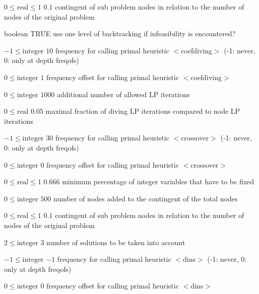 %
{$0\leq\textrm{real}\leq1$}%
{$0.1$}%
{contingent of sub problem nodes in relation to the number of nodes of the original problem}%
{}

%
{boolean}%
{TRUE}%
{use one level of backtracking if infeasibility is encountered?}%
{}

%
{$-1\leq\textrm{integer}$}%
{$10$}%
{frequency for calling primal heuristic $<$coefdiving$>$ (-1: never, 0: only at depth freqofs)}%
{}

%
{$0\leq\textrm{integer}$}%
{$1$}%
{frequency offset for calling primal heuristic $<$coefdiving$>$}%
{}

%
{$0\leq\textrm{integer}$}%
{$1000$}%
{additional number of allowed LP iterations}%
{}

%
{$0\leq\textrm{real}$}%
{$0.05$}%
{maximal fraction of diving LP iterations compared to node LP iterations}%
{}

%
{$-1\leq\textrm{integer}$}%
{$30$}%
{frequency for calling primal heuristic $<$crossover$>$ (-1: never, 0: only at depth freqofs)}%
{}

%
{$0\leq\textrm{integer}$}%
{$0$}%
{frequency offset for calling primal heuristic $<$crossover$>$}%
{}

%
{$0\leq\textrm{real}\leq1$}%
{$0.666$}%
{minimum percentage of integer variables that have to be fixed}%
{}

%
{$0\leq\textrm{integer}$}%
{$500$}%
{number of nodes added to the contingent of the total nodes}%
{}

%
{$0\leq\textrm{real}\leq1$}%
{$0.1$}%
{contingent of sub problem nodes in relation to the number of nodes of the original problem}%
{}

%
{$2\leq\textrm{integer}$}%
{$3$}%
{number of solutions to be taken into account}%
{}

%
{$-1\leq\textrm{integer}$}%
{$-1$}%
{frequency for calling primal heuristic $<$dins$>$ (-1: never, 0: only at depth freqofs)}%
{}

%
{$0\leq\textrm{integer}$}%
{$0$}%
{frequency offset for calling primal heuristic $<$dins$>$}%
{}

